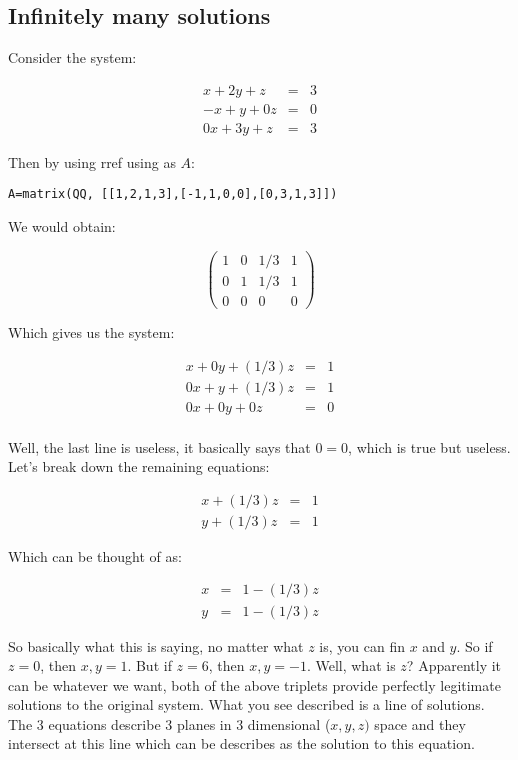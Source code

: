 \subsection{Infinitely many solutions}

Consider the system:


\begin{eqnarray*}
x+2y+z&=&3\\
-x+y+0z&=&0\\
0x+3y+z&=&3
\end{eqnarray*}

Then by using rref using as $A$:


\begin{verbatim}
A=matrix(QQ, [[1,2,1,3],[-1,1,0,0],[0,3,1,3]])
\end{verbatim}

We would obtain:


$$ \left( \begin{array}{rrr|r}
1 & 0 & 1/3& 1\\
0 & 1 & 1/3 & 1\\
0 & 0 & 0 & 0
\end{array}\right)$$

Which gives us the system:

\begin{eqnarray*}
x+0y+(1/3)z&=&1\\
0x+y+(1/3)z&=&1\\
0x+0y+0z&=&0\\
\end{eqnarray*}

Well, the last line is useless, it basically says that $0=0$, which is true but useless.  Let's break down the remaining equations:

\begin{eqnarray*}
x+(1/3)z&=&1\\
y+(1/3)z&=&1
\end{eqnarray*}

Which can be thought of as:

\begin{eqnarray*}
x&=&1-(1/3)z\\
y&=&1-(1/3)z
\end{eqnarray*}

So basically what this is saying, no matter what $z$ is, you can fin $x$ and $y$.  So if $z=0$, then $x,y=1$. But if $z=6$, then $x,y=-1$.  Well, what is $z$?  Apparently it can be whatever we want, both of the above triplets provide perfectly legitimate solutions to the original system.  What you see described is a line of solutions.  The 3 equations describe 3 planes in 3 dimensional ($x,y,z)$ space and they intersect at this line which can be describes as the solution to this equation.

